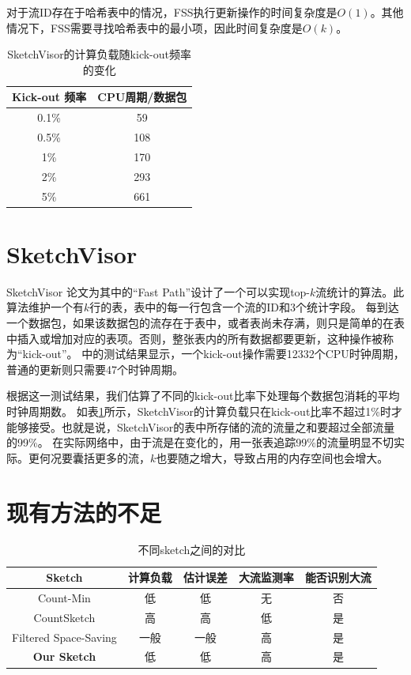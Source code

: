 对于流ID存在于哈希表中的情况，FSS执行更新操作的时间复杂度是$O(1)$。其他情况下，FSS需要寻找哈希表中的最小项，因此时间复杂度是$O(k)$。

\begin{table}[h]
	\centering
	\begin{tabular}{c|c}
		\hline
		Kick-out 频率 & CPU周期/数据包 \\
		\hline
		0.1\% & 59 \\
		\hline
		0.5\% & 108 \\
		\hline
		1\% & 170 \\
		\hline
		2\% & 293 \\
		\hline
		5\% & 661 \\
		\hline
	\end{tabular}
	\caption{SketchVisor的计算负载随kick-out频率的变化}\label{tbl:sketchvisor}
\end{table}

\section{SketchVisor \cite{huang2017sketchvisor}}\label{subsec:sketchvisor}

SketchVisor \cite{huang2017sketchvisor}论文为其中的“Fast Path”设计了一个可以实现top-$k$流统计的算法。此算法维护一个有$k$行的表，表中的每一行包含一个流的ID和3个统计字段。
每到达一个数据包，如果该数据包的流存在于表中，或者表尚未存满，则只是简单的在表中插入或增加对应的表项。否则，整张表内的所有数据都要更新，这种操作被称为“kick-out”。
\cite{huang2017sketchvisor}中的测试结果显示，一个kick-out操作需要12332个CPU时钟周期，普通的更新则只需要47个时钟周期。

根据这一测试结果，我们估算了不同的kick-out比率下处理每个数据包消耗的平均时钟周期数。
如表\ref{tbl:sketchvisor}所示，SketchVisor的计算负载只在kick-out比率不超过1\%时才能够接受。也就是说，SketchVisor的表中所存储的流的流量之和要超过全部流量的99\%。
在实际网络中，由于流是在变化的，用一张表追踪99\%的流量明显不切实际。更何况要囊括更多的流，$k$也要随之增大，导致占用的内存空间也会增大。

\section{现有方法的不足}\label{subsec:observation}

\begin{table}[t]
	\centering
	\begin{tabular}{c|c|c|c|c}
		\hline
		Sketch & 计算负载 &估计误差&大流监测率& 能否识别大流 \\
		\hline
		Count-Min\cite{cormode2004improved} & 低 &低& 无 &否\\
		\hline
		CountSketch\cite{charikar2004finding} & 高 &高 &低&是\\
		\hline
		Filtered Space-Saving\cite{homem2010finding}  & 一般 & 一般&高& 是\\
		\hline
		\textbf{Our Sketch} & 低 &低 &高&是\\
		\hline		
	\end{tabular}
	\caption{不同sketch之间的对比}\label{tbl:sketchcompare}
\end{table}

